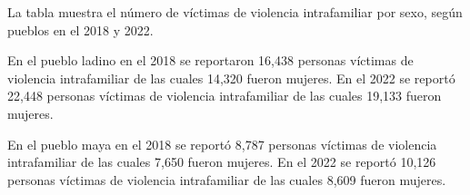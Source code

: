 La tabla muestra el número de víctimas de violencia intrafamiliar por sexo, según pueblos en el 2018 y 2022. 

En el pueblo ladino en el 2018 se reportaron 16,438 personas víctimas de violencia intrafamiliar de las cuales 14,320 fueron mujeres. En el 2022 se reportó 22,448 personas víctimas de violencia intrafamiliar de las cuales 19,133 fueron mujeres.

En el pueblo maya en el 2018 se reportó 8,787 personas víctimas de violencia intrafamiliar de las cuales 7,650 fueron mujeres. En el 2022 se reportó 10,126 personas víctimas de violencia intrafamiliar de las cuales 8,609 fueron mujeres.